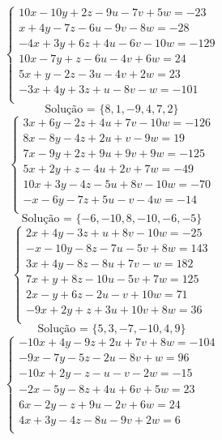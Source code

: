 \documentclass[12pt,oneside,a4paper]{article}
\begin{document}
\vspace{\baselineskip}
\begin{equation*}
\begin{cases}
10x-10y+2z-9u-7v+5w=-23 \\
x+4y-7z-6u-9v-8w=-28 \\
-4x+3y+6z+4u-6v-10w=-129 \\
10x-7y+z-6u-4v+6w=24 \\
5x+y-2z-3u-4v+2w=23 \\
-3x+4y+3z+u-8v-w=-101 \\
\end{cases}
\end{equation*}
\begin{equation*}
\text{Solução = }\{8,1,-9,4,7,2\}
\end{equation*}
\vspace{\baselineskip}
\begin{equation*}
\begin{cases}
3x+6y-2z+4u+7v-10w=-126 \\
8x-8y-4z+2u+v-9w=19 \\
7x-9y+2z+9u+9v+9w=-125 \\
5x+2y+z-4u+2v+7w=-49 \\
10x+3y-4z-5u+8v-10w=-70 \\
-x-6y-7z+5u-v-4w=-14 \\
\end{cases}
\end{equation*}
\begin{equation*}
\text{Solução = }\{-6,-10,8,-10,-6,-5\}
\end{equation*}
\vspace{\baselineskip}
\begin{equation*}
\begin{cases}
2x+4y-3z+u+8v-10w=-25 \\
-x-10y-8z-7u-5v+8w=143 \\
3x+4y-8z-8u+7v-w=182 \\
7x+y+8z-10u-5v+7w=125 \\
2x-y+6z-2u-v+10w=71 \\
-9x+2y+z+3u+10v+8w=36 \\
\end{cases}
\end{equation*}
\begin{equation*}
\text{Solução = }\{5,3,-7,-10,4,9\}
\end{equation*}
\vspace{\baselineskip}
\begin{equation*}
\begin{cases}
-10x+4y-9z+2u+7v+8w=-104 \\
-9x-7y-5z-2u-8v+w=96 \\
-10x+2y-z-u-v-2w=-15 \\
-2x-5y-8z+4u+6v+5w=23 \\
6x-2y-z+9u-2v+6w=24 \\
4x+3y-4z-8u-9v+2w=6 \\
\end{cases}
\end{equation*}
\end{document}
